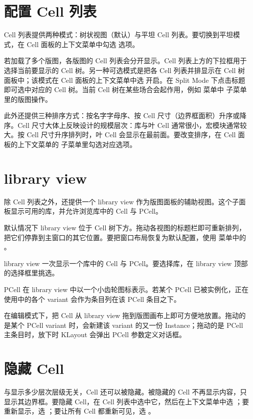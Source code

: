 \section{配置 Cell 列表}\label{sec:cell_list}

Cell 列表提供两种模式：树状视图（默认）与平坦 Cell 列表。要切换到平坦模式，在 Cell 面板的上下文菜单中勾选  选项。

若加载了多个版图，各版图的 Cell 列表会分开显示。Cell 列表上方的下拉框用于选择当前要显示的 Cell 树。另一种可选模式是把各 Cell 列表并排显示在 Cell 树面板中；该模式在 Cell 面板的上下文菜单中选  开启。在 Split Mode 下点击标题即可选中对应的 Cell 树。当前 Cell 树在某些场合会起作用，例如  菜单中  子菜单里的版图操作。

此外还提供三种排序方式：按名字字母序、按 Cell 尺寸（边界框面积）升序或降序。Cell 尺寸大体上反映设计的规模层次：库与叶 Cell 通常很小，宏模块通常较大。按 Cell 尺寸升序排列时，叶 Cell 会显示在最前面。要改变排序，在 Cell 面板的上下文菜单的  子菜单里勾选对应选项。

\section{library view}\label{sec:library_view}

除 Cell 列表之外，还提供一个 library view 作为版图面板的辅助视图。这个子面板显示可用的库，并允许浏览库中的 Cell 与 PCell。

默认情况下 library view 位于 Cell 树下方。拖动各视图的标题栏即可重新排列，把它们停靠到主窗口的其它位置。要把窗口布局恢复为默认配置，使用  菜单中的 。

library view 一次显示一个库中的 Cell 与 PCell。要选择库，在 library view 顶部的选择框里挑选。

PCell 在 library view 中以一个小齿轮图标表示。若某个 PCell 已被实例化，正在使用中的各个 variant 会作为条目列在该 PCell 条目之下。

在编辑模式下，把 Cell 从 library view 拖到版图画布上即可方便地放置。拖动的是某个 PCell variant 时，会新建该 variant 的又一份 Instance；拖动的是 PCell 主条目时，放下时 KLayout 会弹出 PCell 参数定义对话框。

\section{隐藏 Cell}\label{sec:hiding}

与显示多少层次层级无关，Cell 还可以被隐藏。被隐藏的 Cell 不再显示内容，只显示其边界框。要隐藏 Cell，在 Cell 列表中选中它，然后在上下文菜单中选 ；要重新显示，选 ；要让所有 Cell 都重新可见，选 。

